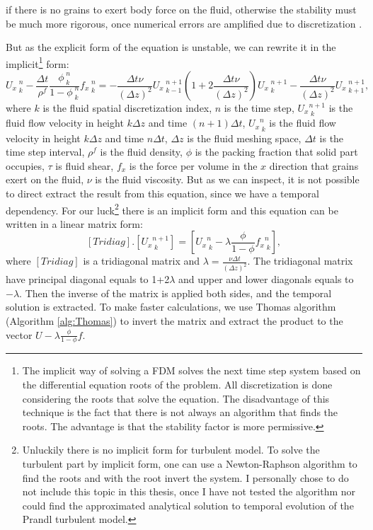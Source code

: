 if there is no grains to exert body force on the fluid, otherwise the stability must be much more rigorous, once numerical errors are amplified due to discretization \cite{Transferencia_de_calor_e_mecanica_dos_fluidos_computacional, Numerical_Methods_for_Scientists_and_Engineers, Numerical_Recipes, Numerical_Solution_of_Partial_Differential_Equations}.

    But as the explicit form of the equation is unstable, we can rewrite it in the implicit\footnote{The implicit way of solving a FDM solves the next time step system based on the differential equation roots of the problem. All discretization is done considering the roots that solve the equation. The disadvantage of this technique is the fact that there is not always an algorithm that finds the roots. The advantage is that the stability factor is more permissive.} form:
\begin{equation}
    {U_{x}}_{\;k}^{\;n} -\frac{\Delta t}{\rho^f}\frac{\phi_{\;k}^{\;n}}{1-\phi_{\;k}^{\;n}}{f_x}_{\;k}^{\;n} = -\frac{\Delta t \nu}{\left(\Delta z\right)^2}{U_{x}}_{\;k-1}^{\;n+1} \left(1+2\frac{\Delta t \nu}{\left(\Delta z\right)^2}\right){U_{x}}_{\;k}^{\;n+1} -\frac{\Delta t \nu}{\left(\Delta z\right)^2}{U_{x}}_{\;k+1}^{\;n+1},
    \label{equ:fluido_discreto_implicito}
\end{equation}
where $k$ is the fluid spatial discretization index, $n$ is the time step, ${U_x}_{\;k}^{n+1}$ is the fluid flow velocity in height $k \Delta z$ and time $(n+1)\Delta t$, ${U_x}_{\;k}^{n}$ is the fluid flow velocity in height $k \Delta z$ and time $n\Delta t$, $\Delta z$ is the fluid meshing space, $\Delta t$ is the time step interval, $\rho^f$ is the fluid density, $\phi$ is the packing fraction that solid part occupies, $\tau$ is fluid shear, $f_x$ is the force per volume in the $x$ direction that grains exert on the fluid, $\nu$ is the fluid viscosity. But as we can inspect, it is not possible to direct extract the result from this equation, since we have a temporal dependency. For our luck\footnote{Unluckily there is no implicit form for turbulent model. To solve the turbulent part by implicit form, one can use a Newton-Raphson algorithm to find the roots and with the root invert the system. I personally chose to do not include this topic in this thesis, once I have not tested the algorithm nor could find the approximated analytical solution to temporal evolution of the Prandl turbulent model.} there is an implicit form and this equation can be written in a linear matrix form:
\begin{equation}
    \left[Tridiag\right].\left[{U_x}_{\;k}^{n+1}\right] = \left[{U_x}_{\;k}^{n} -\lambda \frac{\phi}{1-\phi} {f_x}_{\;k}^{n}\right],
\end{equation}
where $\left[Tridiag\right]$ is a tridiagonal matrix and $\lambda = \frac{\nu \Delta t}{\left(\Delta z\right)^2}$. The tridiagonal matrix have principal diagonal equals to 1+2$\lambda$ and upper and lower diagonals equals to $-\lambda$. Then the inverse of the matrix is applied both sides, and the temporal solution is extracted. To make faster calculations, we use Thomas algorithm (Algorithm \ref{alg:Thomas}) to invert the matrix and extract the product to the vector $U-\lambda \frac{\phi}{1-\phi}f$.

